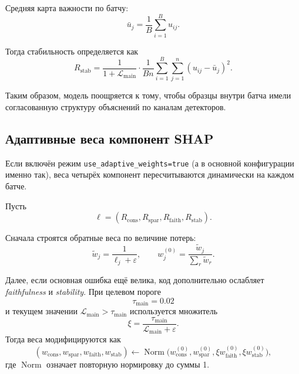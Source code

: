 \documentclass[11pt]{article}
\begin{document}
Средняя карта важности по батчу:
\begin{equation}
 \bar{u}_j = \frac{1}{B} \sum_{i=1}^{B} u_{ij}.
\end{equation}

Тогда стабильность определяется как
\begin{equation}
R_{\mathrm{stab}} = \frac{1}{1 + \mathcal{L}_{\mathrm{main}}}
\cdot
\frac{1}{Bn} \sum_{i=1}^{B} \sum_{j=1}^{n} (u_{ij} - \bar{u}_j)^2.
\end{equation}

Таким образом, модель поощряется к тому, чтобы образцы внутри батча имели согласованную структуру объяснений по каналам детекторов.

\subsection{Адаптивные веса компонент SHAP}

Если включён режим \texttt{use\_adaptive\_weights=true} (а в основной конфигурации именно так), веса четырёх компонент пересчитываются динамически на каждом батче.

Пусть
\begin{equation}
\boldsymbol{\ell} = (R_{\mathrm{cons}}, R_{\mathrm{spar}}, R_{\mathrm{faith}}, R_{\mathrm{stab}}).
\end{equation}

Сначала строятся обратные веса по величине потерь:
\begin{equation}
\tilde{w}_j = \frac{1}{\ell_j + \varepsilon},
\qquad
w_j^{(0)} = \frac{\tilde{w}_j}{\sum_{r} \tilde{w}_r}.
\end{equation}

Далее, если основная ошибка ещё велика, код дополнительно ослабляет \textit{faithfulness} и \textit{stability}. При целевом пороге
\begin{equation}
\tau_{\mathrm{main}} = 0.02
\end{equation}
и текущем значении $\mathcal{L}_{\mathrm{main}} > \tau_{\mathrm{main}}$ используется множитель
\begin{equation}
\xi = \frac{\tau_{\mathrm{main}}}{\mathcal{L}_{\mathrm{main}} + \varepsilon}.
\end{equation}
Тогда веса модифицируются как
\begin{equation}
(w_{\mathrm{cons}}, w_{\mathrm{spar}}, w_{\mathrm{faith}}, w_{\mathrm{stab}})
\leftarrow
\operatorname{Norm}
\bigl(
 w_{\mathrm{cons}}^{(0)},
 w_{\mathrm{spar}}^{(0)},
 \xi w_{\mathrm{faith}}^{(0)},
 \xi w_{\mathrm{stab}}^{(0)}
\bigr),
\end{equation}
где $\operatorname{Norm}$ означает повторную нормировку до суммы 1.
\end{document}
